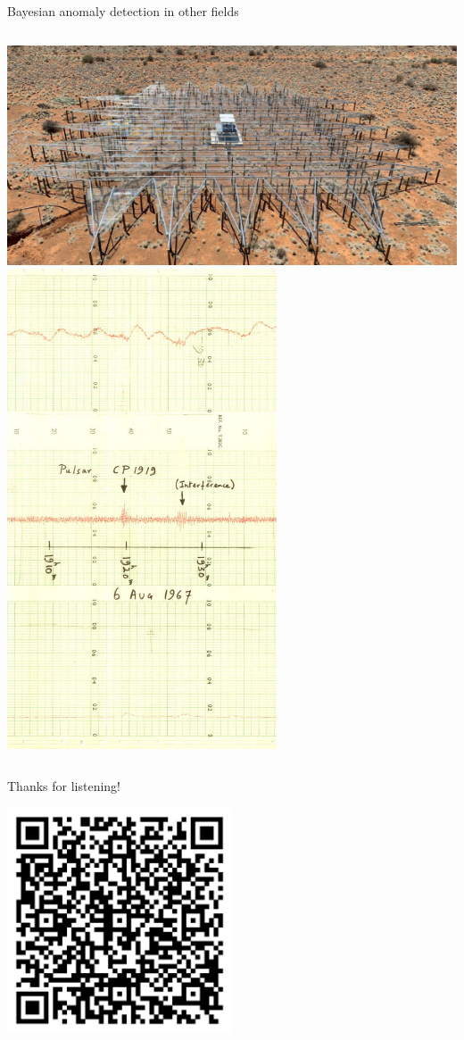 \documentclass[aspectratio=169]{beamer}
\begin{document}
\begin{frame}{Bayesian anomaly detection in other fields}
\begin{columns}
    \includegraphics[width=\textwidth]{images/reach.png}
    \centering
    \includegraphics[width=0.6\textwidth]{images/pulsar.jpeg}
  \end{columns}
\end{frame}

\begin{frame}{Thanks for listening!}
  \vfill
  \begin{center}
    \includegraphics[width=0.5\textwidth]{images/qr.png}
  \end{center}
  \vfill
\end{frame}
\end{document}
